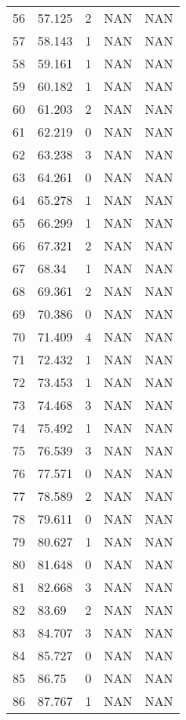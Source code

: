 \documentclass{article}
\begin{document}
\begin{longtable}{@{}lllll@{}}
				56  & 57.125  & 2     & NAN   & NAN   \\
				57  & 58.143  & 1     & NAN   & NAN   \\
				58  & 59.161  & 1     & NAN   & NAN   \\
				59  & 60.182  & 1     & NAN   & NAN   \\
				60  & 61.203  & 2     & NAN   & NAN   \\
				61  & 62.219  & 0     & NAN   & NAN   \\
				62  & 63.238  & 3     & NAN   & NAN   \\
				63  & 64.261  & 0     & NAN   & NAN   \\
				64  & 65.278  & 1     & NAN   & NAN   \\
				65  & 66.299  & 1     & NAN   & NAN   \\
				66  & 67.321  & 2     & NAN   & NAN   \\
				67  & 68.34   & 1     & NAN   & NAN   \\
				68  & 69.361  & 2     & NAN   & NAN   \\
				69  & 70.386  & 0     & NAN   & NAN   \\
				70  & 71.409  & 4     & NAN   & NAN   \\
				71  & 72.432  & 1     & NAN   & NAN   \\
				72  & 73.453  & 1     & NAN   & NAN   \\
				73  & 74.468  & 3     & NAN   & NAN   \\
				74  & 75.492  & 1     & NAN   & NAN   \\
				75  & 76.539  & 3     & NAN   & NAN   \\
				76  & 77.571  & 0     & NAN   & NAN   \\
				77  & 78.589  & 2     & NAN   & NAN   \\
				78  & 79.611  & 0     & NAN   & NAN   \\
				79  & 80.627  & 1     & NAN   & NAN   \\
				80  & 81.648  & 0     & NAN   & NAN   \\
				81  & 82.668  & 3     & NAN   & NAN   \\
				82  & 83.69   & 2     & NAN   & NAN   \\
				83  & 84.707  & 3     & NAN   & NAN   \\
				84  & 85.727  & 0     & NAN   & NAN   \\
				85  & 86.75   & 0     & NAN   & NAN   \\
				86  & 87.767  & 1     & NAN   & NAN   \\

\end{longtable}
\end{document}
